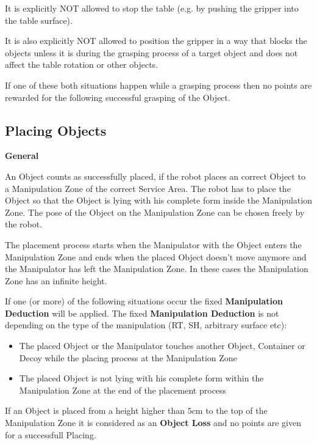 It is explicitly NOT allowed to stop the table (e.g. by pushing the gripper into the table surface).

It is also explicitly NOT allowed to position the gripper in a way that blocks the objects 
unless it is during the grasping process of a target object and does not affect the table rotation or other objects.

If one of these both situations happen while a grasping process then no points are rewarded for the following successful grasping of the Object.

\subsection{Placing Objects} \label{ssec:PlacingObjects}

\textbf{General}

An Object counts as successfully placed, if the robot places an correct Object to a Manipulation Zone of the correct Service Area. The robot has to place the Object so that the Object is lying with his complete form inside the Manipulation Zone. The pose of the Object on the Manipulation Zone can be chosen freely by the robot.

The placement process starts when the Manipulator with the Object enters the Manipulation Zone and ends when the placed Object doesn't move anymore and the Manipulator has left the Manipulation Zone. In these cases the Manipulation Zone has an infinite height.

If one (or more) of the following situations occur the fixed \textbf{Manipulation Deduction} will be applied. The fixed \textbf{Manipulation Deduction} is not depending on the type of the manipulation (RT, SH, arbitrary surface etc):

\begin{itemize}
	\item The placed Object or the Manipulator touches another Object, Container or Decoy while the placing process at the Manipulation Zone 
	\item The placed Object is not lying with his complete form within the Manipulation Zone at the end of the placement process
\end{itemize}




If an Object is placed from a height higher than $5\si{\centi\meter}$ to the top of the Manipulation Zone it is considered as an \textbf{Object Loss} and no points are given for a successfull Placing.

